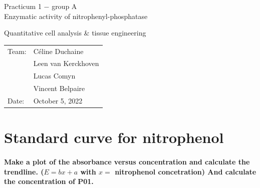 \documentclass[a4paper,12pt]{article}
\begin{document}
\centering
\onecolumn

\noindent
\begin{minipage}[]{0.7\textwidth}
\large{Practicum 1 $-$ group A \\Enzymatic activity of nitrophenyl-phosphatase}\par \vspace{0.1em}
\footnotesize{Quantitative cell analysis \& tissue engineering}\vspace{0.6em}
\flushleft
\begin{tabularx}{}{X l}
Team:  & Céline Duchaine\\
& Leen van Kerckhoven \\
& Lucas Comyn \\
& Vincent Belpaire \\
Date: & October 5, 2022
\end{tabularx}


\end{minipage}%
\begin{minipage}[]{0.3\textwidth}
\end{minipage}

\flushleft

\section{Standard curve for nitrophenol}

\paragraph{Make a plot of the absorbance versus concentration and calculate the trendline. ($E=bx+a$ with $x=$ nitrophenol concetration) And calculate the concentration of P01.}
\end{document}

